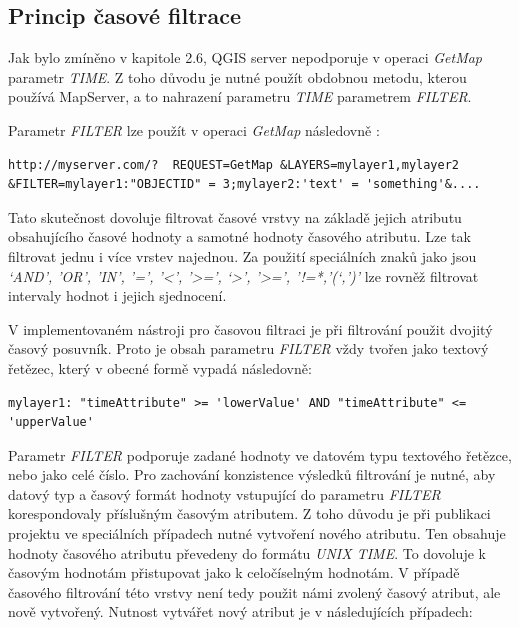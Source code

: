 \subsection{Princip časové filtrace}
Jak bylo zmíněno v kapitole 2.6, QGIS server nepodporuje v
operaci \textit{GetMap} parametr \textit{TIME}. Z toho důvodu je nutné
použít obdobnou metodu, kterou používá MapServer, a to nahrazení
parametru \textit{TIME} parametrem \textit{FILTER}.

\noindent
Parametr \textit{FILTER} lze použít v operaci \textit{GetMap}
následovně \cite{qgis-service}:
\begin{verbatim}
http://myserver.com/?  REQUEST=GetMap &LAYERS=mylayer1,mylayer2
&FILTER=mylayer1:"OBJECTID" = 3;mylayer2:'text' = 'something'&....
\end{verbatim}

Tato skutečnost dovoluje filtrovat časové vrstvy na základě jejich
atributu obsahujícího časové hodnoty a samotné hodnoty časového
atributu. Lze tak filtrovat jednu i více vrstev najednou. Za použití
speciálních znaků jako jsou \textit{‘AND’, ’OR’, ’IN’, ’=’, ’<’, ’>=’,
‘>’, ’>=’, ’!=*,’(‘,’)’} lze rovněž filtrovat intervaly hodnot i
jejich sjednocení.

V implementovaném nástroji pro časovou filtraci je při filtrování
použit dvojitý časový posuvník. Proto je obsah
parametru \textit{FILTER} vždy tvořen jako textový řetězec, který v
obecné formě vypadá následovně:

\begin{verbatim}
mylayer1: "timeAttribute" >= 'lowerValue' AND "timeAttribute" <=
'upperValue'
\end{verbatim}

Parametr \textit{FILTER} podporuje zadané hodnoty ve datovém typu
textového řetězce, nebo jako celé číslo. Pro zachování konzistence
výsledků filtrování je nutné, aby datový typ a časový formát hodnoty
vstupující do parametru \textit{FILTER} korespondovaly příslušným
časovým atributem. Z toho důvodu je při publikaci projektu ve
speciálních případech nutné vytvoření nového atributu. Ten obsahuje
hodnoty časového atributu převedeny do formátu \textit{UNIX TIME}. To
dovoluje k časovým hodnotám přistupovat jako k celočíselným
hodnotám. V případě časového filtrování této vrstvy není tedy použit
námi zvolený časový atribut, ale nově vytvořený. Nutnost vytvářet nový
atribut je v následujících případech:

